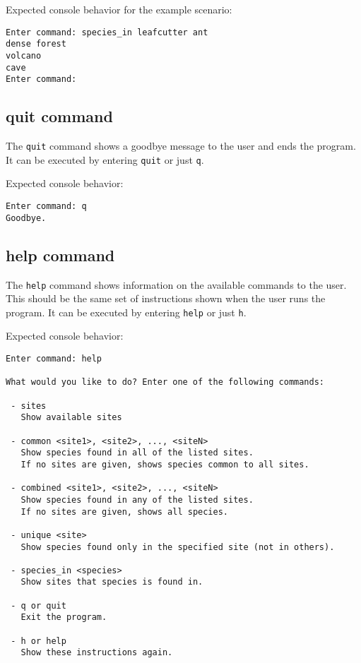 \documentclass[12pt,letterpaper]{article}
\begin{document}
Expected console behavior for the example scenario:
\begin{lstlisting}
Enter command: species_in leafcutter ant
dense forest
volcano
cave
Enter command: 
\end{lstlisting}

\subsection{quit command}
The \texttt{quit} command shows a goodbye message to the user and ends the program. It can be executed by entering \texttt{quit} or just \texttt{q}.

Expected console behavior:
\begin{lstlisting}
Enter command: q
Goodbye.
\end{lstlisting}

\subsection{help command}
The \texttt{help} command shows information on the available commands to the user. This should be the same set of instructions shown when the user runs the program. It can be executed by entering \texttt{help} or just \texttt{h}.

Expected console behavior:
\begin{lstlisting}
Enter command: help

What would you like to do? Enter one of the following commands:

 - sites
   Show available sites

 - common <site1>, <site2>, ..., <siteN>  
   Show species found in all of the listed sites.  
   If no sites are given, shows species common to all sites.

 - combined <site1>, <site2>, ..., <siteN>  
   Show species found in any of the listed sites.  
   If no sites are given, shows all species.

 - unique <site>  
   Show species found only in the specified site (not in others).

 - species_in <species>
   Show sites that species is found in.

 - q or quit  
   Exit the program.

 - h or help  
   Show these instructions again.
\end{lstlisting}
\end{document}
